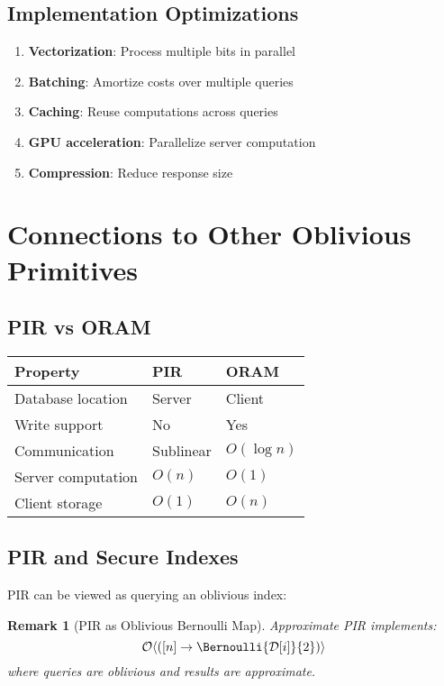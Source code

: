 \documentclass[11pt,final,hidelinks]{article}
\newcommand{\DB}{\mathcal{D}}
\newtheorem{remark}[theorem]{Remark}
\begin{document}
\subsection{Implementation Optimizations}

\begin{enumerate}
    \item \textbf{Vectorization}: Process multiple bits in parallel
    \item \textbf{Batching}: Amortize costs over multiple queries
    \item \textbf{Caching}: Reuse computations across queries
    \item \textbf{GPU acceleration}: Parallelize server computation
    \item \textbf{Compression}: Reduce response size
\end{enumerate}

\section{Connections to Other Oblivious Primitives}

\subsection{PIR vs ORAM}

\begin{center}
\begin{tabular}{lll}
\toprule
\textbf{Property} & \textbf{PIR} & \textbf{ORAM} \\
\midrule
Database location & Server & Client \\
Write support & No & Yes \\
Communication & Sublinear & $O(\log n)$ \\
Server computation & $O(n)$ & $O(1)$ \\
Client storage & $O(1)$ & $O(n)$ \\
\bottomrule
\end{tabular}
\end{center}

\subsection{PIR and Secure Indexes}

PIR can be viewed as querying an oblivious index:

\begin{remark}[PIR as Oblivious Bernoulli Map]
Approximate PIR implements:
\begin{equation}
\ObvMap{[n]}{\Bernoulli{\DB[i]}{2}}
\end{equation}
where queries are oblivious and results are approximate.
\end{remark}
\end{document}
